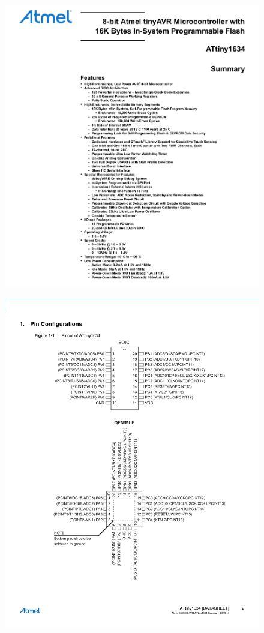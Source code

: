 \documentclass[russian, utf8, 12pt]{eskdtext}
\begin{document}
\ESKDappendix{}{}
\begin{figure} [h!]
	\centering
	\includegraphics[width = \textwidth]{contoller-1.pdf}
\end{figure}
\begin{figure} [h!]
	\centering
	\includegraphics[width = \textwidth]{contoller-2.pdf}
\end{figure}
\end{document}
